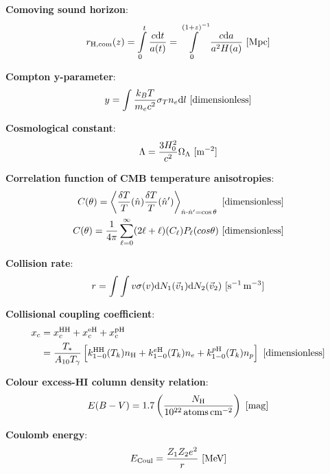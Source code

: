 \documentclass[a4paper,10pt]{article}
\begin{document}
{\noindent}\textbf{Comoving sound horizon}:
\begin{align*}
    r_\mathrm{H,com}(z) = \int\limits_0^t \frac{c\mathrm{d}t}{a(t)} = \int\limits_0^{(1+z)^{-1}} \frac{c\mathrm{d}a}{a^2H(a)} ~ [{\rm Mpc}]
\end{align*}

{\noindent}\textbf{Compton y-parameter}:
\begin{align*}
    y = \int\frac{k_BT}{m_ec^2}\sigma_Tn_e\mathrm{d}l ~ [{\rm dimensionless}]
\end{align*}

{\noindent}\textbf{Cosmological constant}:
\begin{align*}
    \Lambda = \frac{3H_0^2}{c^2}\Omega_\Lambda ~ [{\rm m^{-2}}]
\end{align*}

{\noindent}\textbf{Correlation function of CMB temperature anisotropies}:
\begin{align*}
    C(\theta) = \left\langle\frac{\delta T}{T}(\hat{n})\frac{\delta T}{T}(\hat{n}')\right\rangle_{\hat{n}\cdot\hat{n}'=\cos\theta}  ~ [{\rm dimensionless}] \\
    C(\theta) = \frac{1}{4\pi} \sum\limits_{\ell=0}^\infty (2\ell+\ell)(C_\ell)P_\ell(cos\theta) ~ [{\rm dimensionless}]
\end{align*}

{\noindent}\textbf{Collision rate}:
\begin{align*}
    r = \int\int v\sigma(v){\rm d}N_1(\vec{v}_1){\rm d}N_2(\vec{v}_2) ~ [{\rm s^{-1}\,m^{-3}}]
\end{align*}

{\noindent}\textbf{Collisional coupling coefficient}:
\begin{align*}
    x_c &= x_c^\mathrm{HH} + x_c^\mathrm{eH} + x_c^\mathrm{pH} \\
        &= \frac{T_*}{A_{10}T_\gamma} \left[k_{1-0}^\mathrm{HH}(T_k)n_\mathrm{H}+k_{1-0}^{e\mathrm{H}}(T_k)n_e+k_{1-0}^{p\mathrm{H}}(T_k)n_p\right] ~ [{\rm dimensionless}]
\end{align*}

{\noindent}\textbf{Colour excess-HI column density relation}:
\begin{align*}
    E(B-V) = 1.7 \left(\frac{N_\mathrm{H}}{10^{22}\,{\rm atoms\,cm^{-2}}}\right) ~ [{\rm mag}]
\end{align*}

{\noindent}\textbf{Coulomb energy}:
\begin{align*}
    E_{\rm Coul} = \frac{Z_1Z_2e^2}{r} ~ [{\rm MeV}]
\end{align*}
\end{document}

